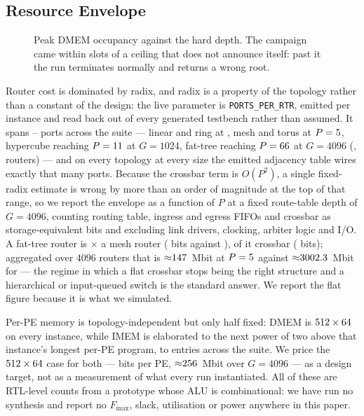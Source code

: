 \documentclass[journal,10pt]{IEEEtran}
\theoremstyle{plain}
\theoremstyle{definition}
\theoremstyle{remark}
\newcommand{\sv}[1]{\texttt{#1}}
\begin{document}
\subsection{Resource Envelope}\label{sec:resource}

\begin{figure}[!t]\centering

\caption{Peak DMEM occupancy against the hard depth. The campaign came within \DmemMargin{} slots of a ceiling that does not announce itself: past it the run terminates normally and returns a wrong root.}\label{fig:dmem}
\end{figure}



Router cost is dominated by radix, and radix is a property of the topology
rather than a constant of the design: the live parameter is
\sv{PORTS\_PER\_RTR}, emitted per instance and read back out of every generated
testbench rather than assumed. It spans \RadixMin--\RadixMax{} ports across the
suite --- linear and ring at \RadixMin, mesh and torus at $P = 5$,
hypercube reaching $P = 11$ at $G = 1024$, fat-tree reaching
$P = 66$ at $G = 4096$ (\RadixMaxInst, \RadixMaxRouters{} routers) ---
and on every topology at every size the emitted adjacency table wires exactly
that many ports. Because the crossbar term is $O(P^2)$, a single fixed-radix
estimate is wrong by more than an order of magnitude at the top of that range,
so we report the envelope as a function of $P$ at a fixed route-table depth of
$G = 4096$, counting routing table, ingress and egress FIFOs and crossbar as
storage-equivalent bits and excluding link drivers, clocking, arbiter logic and
I/O. A fat-tree router is \RouterBlowup$\times$ a mesh
router (\RouterBitsFt{} bits against \RouterBitsLo), \XbarShareFt{} of it
crossbar (\XbarBitsFt{} bits); aggregated over $4096$ routers that is
${\approx}147$~Mbit at $P = 5$ against ${\approx}3002.3$~Mbit
for \RadixMaxInst{} --- the regime in which a flat crossbar stops being the right
structure and a hierarchical or input-queued switch is the standard answer. We
report the flat figure because it is what we simulated.

Per-PE memory is topology-independent but only half fixed: DMEM is
$512 \times 64$ on every instance, while IMEM is elaborated to the next
power of two above that instance's longest per-PE program, \ImemDepthLo{} to
\ImemDepthHi{} entries across the suite. We price the $512 \times 64$
case for both --- \PerPEBits{} bits per PE, ${\approx}256$~Mbit over
$G = 4096$ --- as a design target, not as a measurement of what every run
instantiated. All of these are RTL-level counts from a prototype whose ALU is
combinational: we have run no synthesis and report no $F_{\max}$, slack,
utilisation or power anywhere in this paper.
\end{document}
